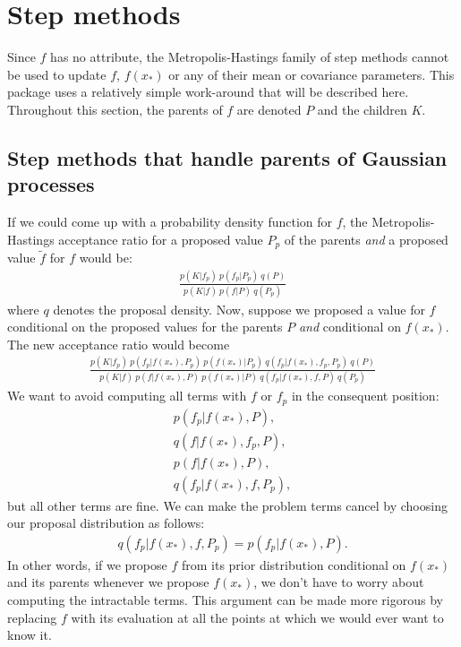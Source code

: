 \section{Step methods}
Since $f$ has no  attribute, the Metropolis-Hastings family of step methods \citep{pymc} cannot be used to update $f$, $f(x_*)$ or any of their mean or covariance parameters. This package uses a relatively simple work-around that will be described here. Throughout this section, the parents of $f$ are denoted $P$ and the children $K$.


\subsection{Step methods that handle parents of Gaussian processes}
If we could come up with a probability density function for $f$, the Metropolis-Hastings acceptance ratio for a proposed value $P_p$ of the parents \emph{and} a proposed value $\tilde f$ for $f$ would be:
\begin{eqnarray*}
    \frac{p(K|f_p)\ p(f_p|P_p)\ q(P)}{p(K|f)\ p(f|P)\ q(P_p)}
\end{eqnarray*}
where $q$ denotes the proposal density. Now, suppose we proposed a value for $f$ conditional on the proposed values for the parents $P$ \emph{and} conditional on $f(x_*)$. The new acceptance ratio would become
\begin{eqnarray*}
    \frac{p(K|f_p)\ p(f_p|f(x_*), P_p)\ p(f(x_*) | P_p)\ q(f_p|f(x_*),f_p, P_p)\ q(P)}{p(K|f)\ p(f|f(x_*), P)\ p(f(x_*) | P)\ q(f_p|f(x_*),f,P)\ q(P_p)}
\end{eqnarray*}
 We want to avoid computing all terms with $f$ or $f_p$ in the consequent position:
\begin{eqnarray*}
    p(f_p|f(x_*), P),\\ q(f|f(x_*),f_p,P),\\ p(f|f(x_*), P),\\ q(f_p|f(x_*),f,P_p),
\end{eqnarray*}
but all other terms are fine. We can make the problem terms cancel by choosing our proposal distribution as follows:
\begin{eqnarray*}
    q(f_p|f(x_*),f,P_p) = p(f_p|f(x_*), P).
\end{eqnarray*}
In other words, if we propose $f$ from its prior distribution conditional on $f(x_*)$ and its parents whenever we propose $f(x_*)$, we don't have to worry about computing the intractable terms. This argument can be made more rigorous by replacing $f$ with its evaluation at all the points at which we would ever want to know it.

